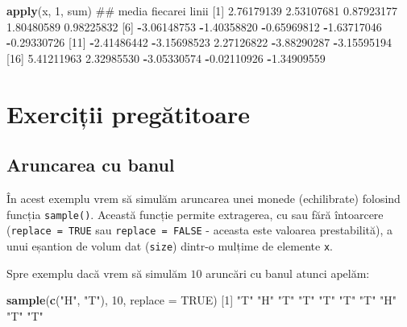 \documentclass[]{article}
\newenvironment{Shaded}{\begin{snugshade}}{\end{snugshade}}
\newcommand{\KeywordTok}[1]{\textcolor[rgb]{0.13,0.29,0.53}{\textbf{#1}}}
\newcommand{\DataTypeTok}[1]{\textcolor[rgb]{0.13,0.29,0.53}{#1}}
\newcommand{\DecValTok}[1]{\textcolor[rgb]{0.00,0.00,0.81}{#1}}
\newcommand{\FloatTok}[1]{\textcolor[rgb]{0.00,0.00,0.81}{#1}}
\newcommand{\StringTok}[1]{\textcolor[rgb]{0.31,0.60,0.02}{#1}}
\newcommand{\OtherTok}[1]{\textcolor[rgb]{0.56,0.35,0.01}{#1}}
\newcommand{\OperatorTok}[1]{\textcolor[rgb]{0.81,0.36,0.00}{\textbf{#1}}}
\newcommand{\NormalTok}[1]{#1}
\begin{document}
\begin{Shaded}
\begin{Highlighting}[]
\KeywordTok{apply}\NormalTok{(x, }\DecValTok{1}\NormalTok{, sum)   ## media fiecarei linii}
\NormalTok{ [}\DecValTok{1}\NormalTok{]  }\FloatTok{2.76179139}  \FloatTok{2.53107681}  \FloatTok{0.87923177}  \FloatTok{1.80480589}  \FloatTok{0.98225832}
\NormalTok{ [}\DecValTok{6}\NormalTok{] }\OperatorTok{-}\FloatTok{3.06148753} \OperatorTok{-}\FloatTok{1.40358820} \OperatorTok{-}\FloatTok{0.65969812} \OperatorTok{-}\FloatTok{1.63717046} \OperatorTok{-}\FloatTok{0.29330726}
\NormalTok{[}\DecValTok{11}\NormalTok{] }\OperatorTok{-}\FloatTok{2.41486442} \OperatorTok{-}\FloatTok{3.15698523}  \FloatTok{2.27126822} \OperatorTok{-}\FloatTok{3.88290287} \OperatorTok{-}\FloatTok{3.15595194}
\NormalTok{[}\DecValTok{16}\NormalTok{]  }\FloatTok{5.41211963}  \FloatTok{2.32985530} \OperatorTok{-}\FloatTok{3.05330574} \OperatorTok{-}\FloatTok{0.02110926} \OperatorTok{-}\FloatTok{1.34909559}
\end{Highlighting}
\end{Shaded}

\section{Exerciții pregătitoare}\label{exercitii-pregatitoare}

\subsection{Aruncarea cu banul}\label{aruncarea-cu-banul}

În acest exemplu vrem să simulăm aruncarea unei monede (echilibrate)
folosind funcția \texttt{sample()}. Această funcție permite extragerea,
cu sau fără întoarcere (\texttt{replace\ =\ TRUE} sau
\texttt{replace\ =\ FALSE} - aceasta este valoarea prestabilită), a unui
eșantion de volum dat (\texttt{size}) dintr-o mulțime de elemente
\texttt{x}.

Spre exemplu dacă vrem să simulăm \(10\) aruncări cu banul atunci
apelăm:

\begin{Shaded}
\begin{Highlighting}[]
\KeywordTok{sample}\NormalTok{(}\KeywordTok{c}\NormalTok{(}\StringTok{"H"}\NormalTok{, }\StringTok{"T"}\NormalTok{), }\DecValTok{10}\NormalTok{, }\DataTypeTok{replace =} \OtherTok{TRUE}\NormalTok{)}
\NormalTok{ [}\DecValTok{1}\NormalTok{] }\StringTok{"T"} \StringTok{"H"} \StringTok{"T"} \StringTok{"T"} \StringTok{"T"} \StringTok{"T"} \StringTok{"T"} \StringTok{"H"} \StringTok{"T"} \StringTok{"T"}
\end{Highlighting}
\end{Shaded}
\end{document}

